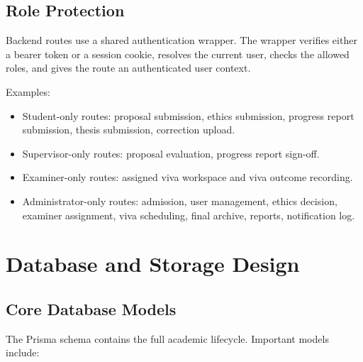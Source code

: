 \documentclass[11pt,a4paper]{article}
\begin{document}
\newpage

\subsection{Role Protection}

Backend routes use a shared authentication wrapper. The wrapper verifies either a bearer token or a session cookie, resolves the current user, checks the allowed roles, and gives the route an authenticated user context.

Examples:

\begin{itemize}
  \item Student-only routes: proposal submission, ethics submission, progress report submission, thesis submission, correction upload.
  \item Supervisor-only routes: proposal evaluation, progress report sign-off.
  \item Examiner-only routes: assigned viva workspace and viva outcome recording.
  \item Administrator-only routes: admission, user management, ethics decision, examiner assignment, viva scheduling, final archive, reports, notification log.
\end{itemize}

\section{Database and Storage Design}

\subsection{Core Database Models}

The Prisma schema contains the full academic lifecycle. Important models include:
\end{document}
